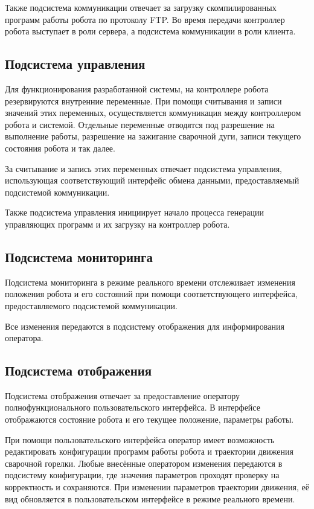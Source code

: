 Также подсистема коммуникации отвечает за загрузку скомпилированных программ работы робота по протоколу FTP. Во время передачи контроллер робота выступает в роли сервера, а подсистема коммуникации в роли клиента.

\subsection{Подсистема управления}
Для функционирования разработанной системы, на контроллере робота резервируются внутренние переменные.
При помощи считывания и записи значений этих переменных, осуществляется коммуникация между контроллером робота и системой.
Отдельные переменные отводятся под разрешение на выполнение работы, разрешение на зажигание сварочной дуги, записи текущего состояния робота и так далее.

За считывание и запись этих переменных отвечает подсистема управления, использующая соответствующий интерфейс обмена данными, предоставляемый подсистемой коммуникации.

Также подсистема управления инициирует начало процесса генерации управляющих программ и их загрузку на контроллер робота.

\subsection{Подсистема мониторинга}
Подсистема мониторинга в режиме реального времени отслеживает изменения положения робота и его состояний при помощи соответствующего интерфейса, предоставляемого подсистемой коммуникации.

Все изменения передаются в подсистему отображения для информирования оператора.

\subsection{Подсистема отображения}
Подсистема отображения отвечает за предоставление оператору полнофункционального пользовательского интерфейса.
В интерфейсе отображаются состояние робота и его текущее положение, параметры работы.

При помощи пользовательского интерфейса оператор имеет возможность редактировать конфигурации программ работы робота и траектории движения сварочной горелки.
Любые внесённые оператором изменения передаются в подсистему конфигурации, где значения параметров проходят проверку на корректность и сохраняются.
При изменении параметров траектории движения, её вид обновляется в пользовательском интерфейсе в режиме реального времени.


